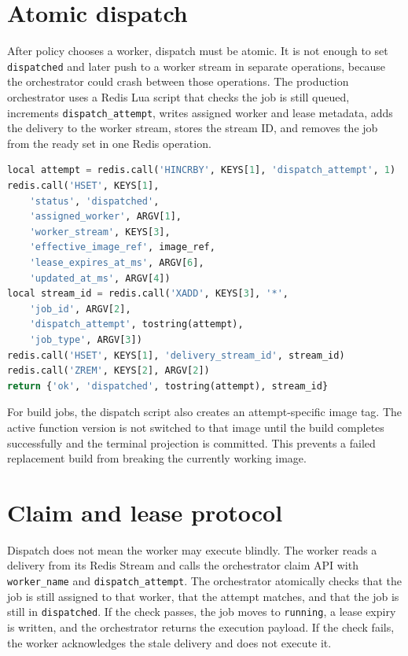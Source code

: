 \documentclass[12pt,a4paper]{report}
\newcommand{\state}[1]{\texttt{#1}}
\newcommand{\file}[1]{\texttt{#1}}
\begin{document}
\section{Atomic dispatch}

After policy chooses a worker, dispatch must be atomic. It is not enough to set
\state{dispatched} and later push to a worker stream in separate operations,
because the orchestrator could crash between those operations. The production
orchestrator uses a Redis Lua script that checks the job is still queued,
increments \file{dispatch\_attempt}, writes assigned worker and lease metadata,
adds the delivery to the worker stream, stores the stream ID, and removes the
job from the ready set in one Redis operation.

\begin{lstlisting}[language=Python,caption={Atomic dispatch script from scheduler/production\_orchestrator.py.}]
local attempt = redis.call('HINCRBY', KEYS[1], 'dispatch_attempt', 1)
redis.call('HSET', KEYS[1],
    'status', 'dispatched',
    'assigned_worker', ARGV[1],
    'worker_stream', KEYS[3],
    'effective_image_ref', image_ref,
    'lease_expires_at_ms', ARGV[6],
    'updated_at_ms', ARGV[4])
local stream_id = redis.call('XADD', KEYS[3], '*',
    'job_id', ARGV[2],
    'dispatch_attempt', tostring(attempt),
    'job_type', ARGV[3])
redis.call('HSET', KEYS[1], 'delivery_stream_id', stream_id)
redis.call('ZREM', KEYS[2], ARGV[2])
return {'ok', 'dispatched', tostring(attempt), stream_id}
\end{lstlisting}

For build jobs, the dispatch script also creates an attempt-specific image tag.
The active function version is not switched to that image until the build
completes successfully and the terminal projection is committed. This prevents
a failed replacement build from breaking the currently working image.

\section{Claim and lease protocol}

Dispatch does not mean the worker may execute blindly. The worker reads a
delivery from its Redis Stream and calls the orchestrator claim API with
\file{worker\_name} and \file{dispatch\_attempt}. The orchestrator atomically
checks that the job is still assigned to that worker, that the attempt matches,
and that the job is still in \state{dispatched}. If the check passes, the job
moves to \state{running}, a lease expiry is written, and the orchestrator returns
the execution payload. If the check fails, the worker acknowledges the stale
delivery and does not execute it.
\end{document}

